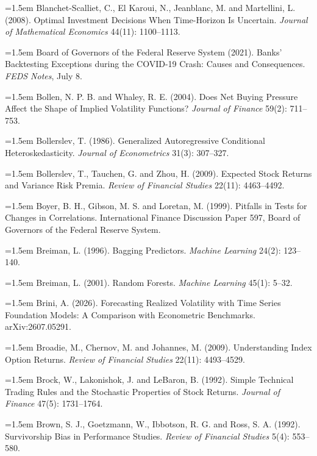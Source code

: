 \hangindent=1.5em Blanchet-Scalliet, C., El Karoui, N., Jeanblanc, M. and Martellini, L. (2008). Optimal Investment Decisions When Time-Horizon Is Uncertain. \emph{Journal of Mathematical Economics} 44(11): 1100--1113.

\hangindent=1.5em Board of Governors of the Federal Reserve System (2021). Banks' Backtesting Exceptions during the COVID-19 Crash: Causes and Consequences. \emph{FEDS Notes}, July 8.

\hangindent=1.5em Bollen, N. P. B. and Whaley, R. E. (2004). Does Net Buying Pressure Affect the Shape of Implied Volatility Functions? \emph{Journal of Finance} 59(2): 711--753.

\hangindent=1.5em Bollerslev, T. (1986). Generalized Autoregressive Conditional Heteroskedasticity. \emph{Journal of Econometrics} 31(3): 307--327.

\hangindent=1.5em Bollerslev, T., Tauchen, G. and Zhou, H. (2009). Expected Stock Returns and Variance Risk Premia. \emph{Review of Financial Studies} 22(11): 4463--4492.

\hangindent=1.5em Boyer, B. H., Gibson, M. S. and Loretan, M. (1999). Pitfalls in Tests for Changes in Correlations. International Finance Discussion Paper 597, Board of Governors of the Federal Reserve System.

\hangindent=1.5em Breiman, L. (1996). Bagging Predictors. \emph{Machine Learning} 24(2): 123--140.

\hangindent=1.5em Breiman, L. (2001). Random Forests. \emph{Machine Learning} 45(1): 5--32.

\hangindent=1.5em Brini, A. (2026). Forecasting Realized Volatility with Time Series Foundation Models: A Comparison with Econometric Benchmarks. arXiv:2607.05291.

\hangindent=1.5em Broadie, M., Chernov, M. and Johannes, M. (2009). Understanding Index Option Returns. \emph{Review of Financial Studies} 22(11): 4493--4529.

\hangindent=1.5em Brock, W., Lakonishok, J. and LeBaron, B. (1992). Simple Technical Trading Rules and the Stochastic Properties of Stock Returns. \emph{Journal of Finance} 47(5): 1731--1764.

\hangindent=1.5em Brown, S. J., Goetzmann, W., Ibbotson, R. G. and Ross, S. A. (1992). Survivorship Bias in Performance Studies. \emph{Review of Financial Studies} 5(4): 553--580.

